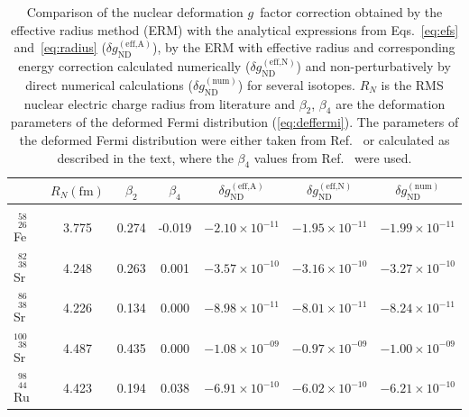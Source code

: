 \begin{table}
\begin{minipage}{\textwidth}
\caption{\label{tab:spline}%
Comparison of the nuclear deformation $g$~factor correction obtained by the effective radius method (ERM) with the analytical expressions from Eqs.~\eqref{eq:efs} and~\eqref{eq:radius} ($\delta g_{\text{ND}}^{(\text{eff,A})}$), by the ERM with effective radius and corresponding energy correction calculated numerically ($\delta g_{\text{ND}}^{(\text{eff,N})}$) and non-perturbatively by direct numerical calculations ($\delta g_{\text{ND}}^{(\text{num})}$) for several isotopes. $R_N$ is the RMS nuclear electric charge radius from literature \cite{Angeli2013} and $\beta_2$, $\beta_4$ are the deformation parameters of the deformed Fermi distribution (\ref{eq:deffermi}). The parameters of the deformed Fermi distribution were either taken from Ref.~\cite{jacek2012} or calculated as described in the text, where the $\beta_4$ values from Ref.~\cite{Moller1995} were used.
}
\centering
\renewcommand*{\thefootnote}{\alph{footnote}}
\begin{tabular}{lcccccc}
 & \multicolumn{1}{c}{$R{\scriptstyle _N(\text{fm})}$} & \multicolumn{1}{c}{$\beta_2$} & \multicolumn{1}{c}{$\beta_4$} & \multicolumn{1}{c}{$\delta g_{\text{ND}}^{(\text{eff,A})}$} & \multicolumn{1}{c}{$\delta g_{\text{ND}}^{(\text{eff,N})}$} & \multicolumn{1}{c}{$\delta g_{\text{ND}}^{(\text{num})}$}\\
\hline\\[-5pt]
$^{\phantom{0}58}_{\phantom{0}26}$Fe$\;$\footnotemark[1] & 3.775 & 0.274                 & -0.019        & $-2.10\times 10^{-11}$ & $-1.95\times 10^{-11}$ & $-1.99\times 10^{-11}$ \\[4pt]
$^{\phantom{0}82}_{\phantom{0}38}$Sr$\;$\footnotemark[1] & 4.248 & 0.263                 & 0.001         & $-3.57\times 10^{-10}$ & $-3.16\times 10^{-10}$ & $-3.27\times 10^{-10}$ \\[4pt]
$^{\phantom{0}86}_{\phantom{0}38}$Sr$\;$\footnotemark[2] & 4.226 & 0.134\footnotemark[3] & 0.000         & $-8.98\times 10^{-11}$ & $-8.01\times 10^{-11}$ & $-8.24\times 10^{-11}$ \\[4pt]
$^{100}_{\phantom{0}38}$Sr$\;$\footnotemark[2]           & 4.487 & 0.435\footnotemark[3] & 0.000         & $-1.08\times 10^{-09}$ & $-0.97\times 10^{-09}$ & $-1.00\times 10^{-09}$ \\[4pt]
$^{\phantom{0}98}_{\phantom{0}44}$Ru$\;$\footnotemark[1] & 4.423 & 0.194                 & 0.038         & $-6.91\times 10^{-10}$ & $-6.02\times 10^{-10}$ & $-6.21\times 10^{-10}$ \\[4pt]

\end{tabular}
\end{minipage}
\end{table}
